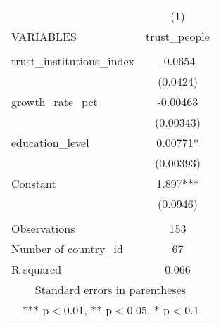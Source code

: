 \documentclass[]{article}
\begin{document}
\begin{tabular}{lc} \hline
 & (1) \\
VARIABLES & trust\_people \\ \hline
 &  \\
trust\_institutions\_index & -0.0654 \\
 & (0.0424) \\
growth\_rate\_pct & -0.00463 \\
 & (0.00343) \\
education\_level & 0.00771* \\
 & (0.00393) \\
Constant & 1.897*** \\
 & (0.0946) \\
 &  \\
Observations & 153 \\
Number of country\_id & 67 \\
 R-squared & 0.066 \\ \hline
\multicolumn{2}{c}{ Standard errors in parentheses} \\
\multicolumn{2}{c}{ *** p$<$0.01, ** p$<$0.05, * p$<$0.1} \\
\end{tabular}
\end{document}
